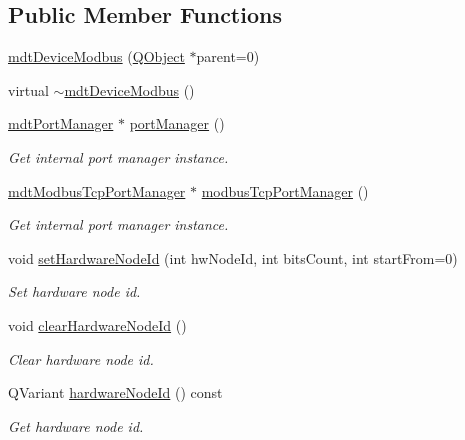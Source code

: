 \subsection*{Public Member Functions}
\begin{DoxyCompactItemize}
\item 
\hyperlink{classmdt_device_modbus_ac69cfbe26681342ba05672ab63de2a1f}{mdt\-Device\-Modbus} (\hyperlink{class_q_object}{Q\-Object} $\ast$parent=0)
\item 
virtual \hyperlink{classmdt_device_modbus_a4696f2e3855917a3e3c02a822f9664e2}{$\sim$mdt\-Device\-Modbus} ()
\item 
\hyperlink{classmdt_port_manager}{mdt\-Port\-Manager} $\ast$ \hyperlink{classmdt_device_modbus_aed892b501f8cbd372ccfda1a4fafa536}{port\-Manager} ()
\begin{DoxyCompactList}\small\item\em Get internal port manager instance. \end{DoxyCompactList}\item 
\hyperlink{classmdt_modbus_tcp_port_manager}{mdt\-Modbus\-Tcp\-Port\-Manager} $\ast$ \hyperlink{classmdt_device_modbus_ac547788aa95d46c00ddb1342eb46ef93}{modbus\-Tcp\-Port\-Manager} ()
\begin{DoxyCompactList}\small\item\em Get internal port manager instance. \end{DoxyCompactList}\item 
void \hyperlink{classmdt_device_modbus_a64bfa566dbd8511e11d76c0b14191f17}{set\-Hardware\-Node\-Id} (int hw\-Node\-Id, int bits\-Count, int start\-From=0)
\begin{DoxyCompactList}\small\item\em Set hardware node id. \end{DoxyCompactList}\item 
void \hyperlink{classmdt_device_modbus_a4ec2b55127b7b853488f102f2c5215f8}{clear\-Hardware\-Node\-Id} ()
\begin{DoxyCompactList}\small\item\em Clear hardware node id. \end{DoxyCompactList}\item 
Q\-Variant \hyperlink{classmdt_device_modbus_ab5e3f041a24d895dbe739a9229d4fd27}{hardware\-Node\-Id} () const 
\begin{DoxyCompactList}\small\item\em Get hardware node id. \end{DoxyCompactList}\item 

\end{DoxyCompactItemize}
